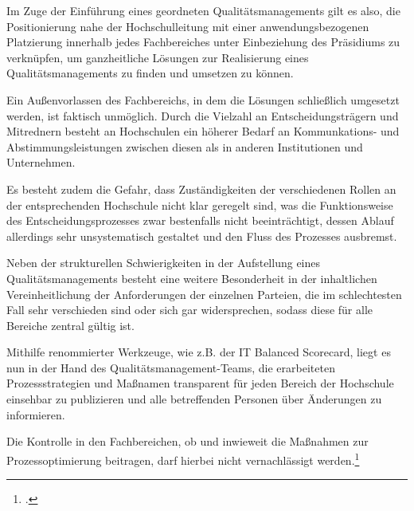 Im Zuge der Einführung eines geordneten Qualitätsmanagements gilt es also, die Positionierung nahe der 
Hochschulleitung mit einer anwendungsbezogenen Platzierung innerhalb jedes Fachbereiches unter 
Einbeziehung des Präsidiums zu verknüpfen, um ganzheitliche Lösungen zur Realisierung eines 
Qualitätsmanagements zu finden und umsetzen zu können.

Ein Außenvorlassen des Fachbereichs, in dem die Lösungen schließlich umgesetzt werden, ist faktisch 
unmöglich. Durch die Vielzahl an Entscheidungsträgern und Mitrednern besteht an Hochschulen ein höherer 
Bedarf an Kommunkations- und Abstimmungsleistungen zwischen diesen als in anderen Institutionen und 
Unternehmen. 

Es besteht zudem die Gefahr, dass Zuständigkeiten der verschiedenen Rollen an der entsprechenden 
Hochschule nicht klar geregelt sind, was die Funktionsweise des Entscheidungsprozesses zwar bestenfalls 
nicht beeinträchtigt, dessen Ablauf allerdings sehr unsystematisch gestaltet und den Fluss des Prozesses 
ausbremst.

Neben der strukturellen Schwierigkeiten in der Aufstellung eines Qualitätsmanagements besteht eine weitere Besonderheit in der inhaltlichen Vereinheitlichung der Anforderungen der einzelnen Parteien, die im schlechtesten Fall sehr verschieden sind oder sich gar widersprechen, sodass diese für alle Bereiche zentral gültig ist. 

Mithilfe renommierter Werkzeuge, wie z.B. der IT Balanced Scorecard, liegt es nun in der Hand des 
Qualitätsmanagement-Teams, die erarbeiteten Prozessstrategien und Maßnamen transparent für jeden 
Bereich der Hochschule einsehbar zu publizieren und alle betreffenden Personen über Änderungen zu 
informieren. 

Die Kontrolle in den Fachbereichen, ob und inwieweit die 
Maßnahmen zur Prozessoptimierung beitragen, darf hierbei nicht vernachlässigt werden.\footcite{evalag_eckpunkte_2012}

